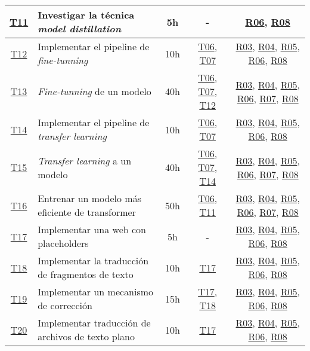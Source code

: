 \begin{landscape}
\begin{table}
\begin{tabular}{ | c | l | c | c | c | }
        \hline
        \hyperref[T11]{T11} & Investigar la técnica \textit{model distillation} & 5h & - & \hyperref[R06]{R06}, \hyperref[R08]{R08} \\
        \hline
        \hyperref[T12]{T12} & Implementar el pipeline de \textit{fine-tunning} & 10h & \hyperref[T06]{T06}, \hyperref[T07]{T07} & \hyperref[R03]{R03}, \hyperref[R04]{R04}, \hyperref[R05]{R05}, \hyperref[R06]{R06}, \hyperref[R08]{R08} \\
        \hline
        \hyperref[T13]{T13} & \textit{Fine-tunning} de un modelo & 40h & \hyperref[T06]{T06}, \hyperref[T07]{T07}, \hyperref[T12]{T12} & \hyperref[R03]{R03}, \hyperref[R04]{R04}, \hyperref[R05]{R05}, \hyperref[R06]{R06}, \hyperref[R07]{R07}, \hyperref[R08]{R08} \\
        \hline
        \hyperref[T14]{T14} & Implementar el pipeline de \textit{transfer learning} & 10h & \hyperref[T06]{T06}, \hyperref[T07]{T07} & \hyperref[R03]{R03}, \hyperref[R04]{R04}, \hyperref[R05]{R05}, \hyperref[R06]{R06}, \hyperref[R08]{R08} \\
        \hline
        \hyperref[T15]{T15} & \textit{Transfer learning} a un modelo & 40h & \hyperref[T06]{T06}, \hyperref[T07]{T07}, \hyperref[T14]{T14} & \hyperref[R03]{R03}, \hyperref[R04]{R04}, \hyperref[R05]{R05}, \hyperref[R06]{R06}, \hyperref[R07]{R07}, \hyperref[R08]{R08} \\
        \hline
        \hyperref[T16]{T16} & Entrenar un modelo más eficiente de transformer & 50h & \hyperref[T06]{T06}, \hyperref[T11]{T11} & \hyperref[R03]{R03}, \hyperref[R04]{R04}, \hyperref[R05]{R05}, \hyperref[R06]{R06}, \hyperref[R07]{R07}, \hyperref[R08]{R08} \\
        \hline
        \hyperref[T17]{T17} & Implementar una web con placeholders & 5h & - & \hyperref[R03]{R03}, \hyperref[R04]{R04}, \hyperref[R05]{R05}, \hyperref[R06]{R06}, \hyperref[R08]{R08} \\
        \hline
        \hyperref[T18]{T18} & Implementar la traducción de fragmentos de texto & 10h & \hyperref[T17]{T17} & \hyperref[R03]{R03}, \hyperref[R04]{R04}, \hyperref[R05]{R05}, \hyperref[R06]{R06}, \hyperref[R08]{R08} \\
        \hline
        \hyperref[T19]{T19} & Implementar un mecanismo de corrección & 15h & \hyperref[T17]{T17}, \hyperref[T18]{T18} & \hyperref[R03]{R03}, \hyperref[R04]{R04}, \hyperref[R05]{R05}, \hyperref[R06]{R06}, \hyperref[R08]{R08} \\
        \hline
        \hyperref[T20]{T20} & Implementar traducción de archivos de texto plano & 10h & \hyperref[T17]{T17} & \hyperref[R03]{R03}, \hyperref[R04]{R04}, \hyperref[R05]{R05}, \hyperref[R06]{R06}, \hyperref[R08]{R08} \\

\end{tabular}
\end{table}
\end{landscape}
